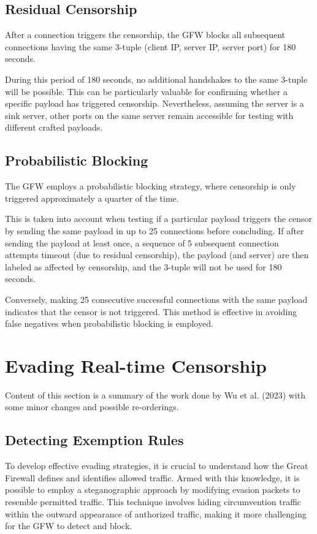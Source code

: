 \subsection{Residual Censorship}
After a connection triggers the censorship, the GFW blocks all subsequent connections having the same 3-tuple (client IP, server IP, server port) for 180 seconds.\cite{wu2023great}

During this period of 180 seconds, no additional handshakes to the same 3-tuple will be possible. This can be particularly valuable for confirming whether a specific payload has triggered censorship. Nevertheless, assuming the server is a sink server, other ports on the same server remain accessible for testing with different crafted payloads. 

\subsection{Probabilistic Blocking}
The GFW employs a probabilistic blocking strategy, where censorship is only triggered approximately a quarter of the time.

This is taken into account when testing if a particular payload triggers the censor by sending the same payload in up to 25 connections before concluding. If after sending the payload at least once, a sequence of 5 subsequent connection attempts timeout (due to residual censorship), the payload (and server) are then labeled as affected by censorship, and the 3-tuple will not be used for 180 seconds. 

Conversely, making 25 consecutive successful connections with the same payload indicates that the censor is not triggered. This method is effective in avoiding false negatives when probabilistic blocking is employed.\cite{wu2023great}

\section{Evading Real-time Censorship}
Content of this section is a summary of the work done by Wu et al. (2023) with some minor changes and possible re-orderings.\cite{wu2023great}

\subsection{Detecting Exemption Rules}
To develop effective evading strategies, it is crucial to understand how the Great Firewall defines and identifies allowed traffic. Armed with this knowledge, it is possible to employ a steganographic approach by modifying evasion packets to resemble permitted traffic. This technique involves hiding circumvention traffic within the outward appearance of authorized traffic, making it more challenging for the GFW to detect and block. 

